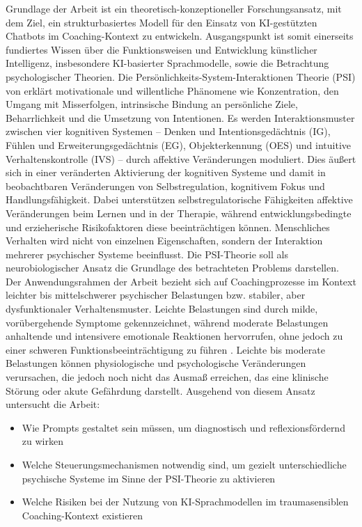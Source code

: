 Grundlage der Arbeit ist ein theoretisch-konzeptioneller Forschungsansatz, mit dem Ziel, ein strukturbasiertes Modell für den Einsatz von KI-gestützten Chatbots im Coaching-Kontext zu entwickeln. Ausgangspunkt ist somit einerseits fundiertes Wissen über die Funktionsweisen und Entwicklung künstlicher Intelligenz, insbesondere KI-basierter Sprachmodelle, sowie die Betrachtung psychologischer Theorien. 
Die Persönlichkeits-System-Interaktionen Theorie (PSI) von \cite{Kuhl2000The} erklärt motivationale und willentliche Phänomene wie Konzentration, den Umgang mit Misserfolgen, intrinsische Bindung an persönliche Ziele, Beharrlichkeit und die Umsetzung von Intentionen. Es werden Interaktionsmuster zwischen vier kognitiven Systemen – Denken und Intentionsgedächtnis (IG), Fühlen und Erweiterungsgedächtnis (EG), Objekterkennung (OES) und intuitive Verhaltenskontrolle (IVS) – durch affektive Veränderungen moduliert. Dies äußert sich in einer veränderten Aktivierung der kognitiven Systeme und damit in beobachtbaren Veränderungen von Selbstregulation, kognitivem Fokus und Handlungsfähigkeit. Dabei unterstützen selbstregulatorische Fähigkeiten affektive Veränderungen beim Lernen und in der Therapie, während entwicklungsbedingte und erzieherische Risikofaktoren diese beeinträchtigen können. Menschliches Verhalten wird nicht von einzelnen Eigenschaften, sondern der Interaktion mehrerer psychischer Systeme beeinflusst. Die PSI-Theorie soll als neurobiologischer Ansatz die Grundlage des betrachteten Problems darstellen. 
Der Anwendungsrahmen der Arbeit bezieht sich auf Coachingprozesse im Kontext leichter bis mittelschwerer psychischer Belastungen bzw. stabiler, aber dysfunktionaler Verhaltensmuster. Leichte Belastungen sind durch milde, vorübergehende Symptome gekennzeichnet, während moderate Belastungen anhaltende und intensivere emotionale Reaktionen hervorrufen, ohne jedoch zu einer schweren Funktionsbeeinträchtigung zu führen \citep{Ovsiannikova2024Peculiarities}. Leichte bis moderate Belastungen können physiologische und psychologische Veränderungen verursachen, die jedoch noch nicht das Ausmaß erreichen, das eine klinische Störung oder akute Gefährdung darstellt.  
Ausgehend von diesem Ansatz untersucht die Arbeit:

    \begin{itemize}
    \item Wie Prompts gestaltet sein müssen, um diagnostisch und reflexionsfördernd zu wirken
    \item Welche Steuerungsmechanismen notwendig sind, um gezielt unterschiedliche psychische Systeme im Sinne der PSI-Theorie zu aktivieren
    \item Welche Risiken bei der Nutzung von KI-Sprachmodellen im traumasensiblen Coaching-Kontext existieren
    \end{itemize}

